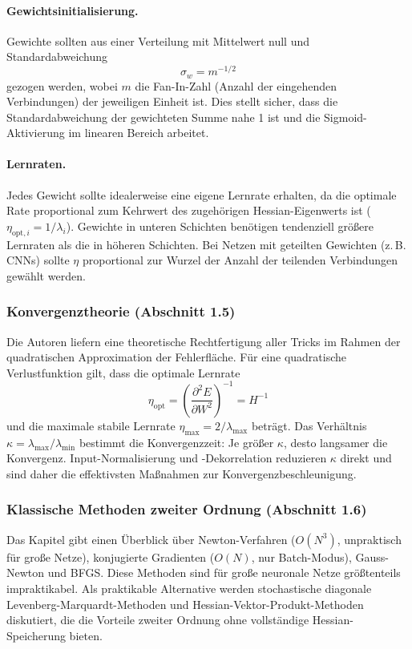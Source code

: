 \documentclass[a4paper,12pt]{article}
\begin{document}
\paragraph{Gewichtsinitialisierung.}
Gewichte sollten aus einer Verteilung mit Mittelwert null und Standardabweichung
\[
    \sigma_w = m^{-1/2}
\]
gezogen werden, wobei $m$ die Fan-In-Zahl (Anzahl der eingehenden Verbindungen) der jeweiligen Einheit ist. Dies stellt sicher, dass die Standardabweichung der gewichteten Summe nahe 1 ist und die Sigmoid-Aktivierung im linearen Bereich arbeitet.

\paragraph{Lernraten.}
Jedes Gewicht sollte idealerweise eine eigene Lernrate erhalten, da die optimale Rate proportional zum Kehrwert des zugehörigen Hessian-Eigenwerts ist ($\eta_{\text{opt},i} = 1/\lambda_i$). Gewichte in unteren Schichten benötigen tendenziell größere Lernraten als die in höheren Schichten. Bei Netzen mit geteilten Gewichten (z.\,B. CNNs) sollte $\eta$ proportional zur Wurzel der Anzahl der teilenden Verbindungen gewählt werden.

\subsubsection*{Konvergenztheorie (Abschnitt 1.5)}

Die Autoren liefern eine theoretische Rechtfertigung aller Tricks im Rahmen der quadratischen Approximation der Fehlerfläche. Für eine quadratische Verlustfunktion gilt, dass die optimale Lernrate
\[
    \eta_{\text{opt}} = \left(\frac{\partial^2 E}{\partial W^2}\right)^{-1} = H^{-1}
\]
und die maximale stabile Lernrate $\eta_{\max} = 2/\lambda_{\max}$ beträgt. Das Verhältnis $\kappa = \lambda_{\max}/\lambda_{\min}$ bestimmt die Konvergenzzeit: Je größer $\kappa$, desto langsamer die Konvergenz. Input-Normalisierung und -Dekorrelation reduzieren $\kappa$ direkt und sind daher die effektivsten Maßnahmen zur Konvergenzbeschleunigung.

\subsubsection*{Klassische Methoden zweiter Ordnung (Abschnitt 1.6)}

Das Kapitel gibt einen Überblick über Newton-Verfahren ($O(N^3)$, unpraktisch für große Netze), konjugierte Gradienten ($O(N)$, nur Batch-Modus), Gauss-Newton und BFGS. Diese Methoden sind für große neuronale Netze größtenteils impraktikabel. Als praktikable Alternative werden stochastische diagonale Levenberg-Marquardt-Methoden und Hessian-Vektor-Produkt-Methoden diskutiert, die die Vorteile zweiter Ordnung ohne vollständige Hessian-Speicherung bieten.
\end{document}

